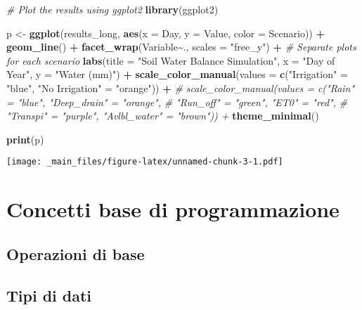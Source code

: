 \documentclass[
]{book}
\newenvironment{Shaded}{\begin{snugshade}}{\end{snugshade}}
\newcommand{\AttributeTok}[1]{\textcolor[rgb]{0.13,0.29,0.53}{#1}}
\newcommand{\CommentTok}[1]{\textcolor[rgb]{0.56,0.35,0.01}{\textit{#1}}}
\newcommand{\FunctionTok}[1]{\textcolor[rgb]{0.13,0.29,0.53}{\textbf{#1}}}
\newcommand{\NormalTok}[1]{#1}
\newcommand{\OtherTok}[1]{\textcolor[rgb]{0.56,0.35,0.01}{#1}}
\newcommand{\SpecialCharTok}[1]{\textcolor[rgb]{0.81,0.36,0.00}{\textbf{#1}}}
\newcommand{\StringTok}[1]{\textcolor[rgb]{0.31,0.60,0.02}{#1}}
\theoremstyle{definition}
\theoremstyle{definition}
\theoremstyle{definition}
\theoremstyle{definition}
\theoremstyle{remark}
\begin{document}
\begin{Shaded}
\begin{Highlighting}[]
\CommentTok{\# Plot the results using ggplot2}
\FunctionTok{library}\NormalTok{(ggplot2)}

\NormalTok{p }\OtherTok{\textless{}{-}} \FunctionTok{ggplot}\NormalTok{(results\_long, }\FunctionTok{aes}\NormalTok{(}\AttributeTok{x =}\NormalTok{ Day, }\AttributeTok{y =}\NormalTok{ Value, }\AttributeTok{color =}\NormalTok{ Scenario)) }\SpecialCharTok{+}
  \FunctionTok{geom\_line}\NormalTok{() }\SpecialCharTok{+}
  \FunctionTok{facet\_wrap}\NormalTok{(Variable}\SpecialCharTok{\textasciitilde{}}\NormalTok{., }\AttributeTok{scales =} \StringTok{"free\_y"}\NormalTok{) }\SpecialCharTok{+}  \CommentTok{\# Separate plots for each scenario}
  \FunctionTok{labs}\NormalTok{(}\AttributeTok{title =} \StringTok{"Soil Water Balance Simulation"}\NormalTok{, }\AttributeTok{x =} \StringTok{"Day of Year"}\NormalTok{, }\AttributeTok{y =} \StringTok{"Water (mm)"}\NormalTok{) }\SpecialCharTok{+}
  \FunctionTok{scale\_color\_manual}\NormalTok{(}\AttributeTok{values =} \FunctionTok{c}\NormalTok{(}\StringTok{"Irrigation"} \OtherTok{=} \StringTok{"blue"}\NormalTok{, }\StringTok{"No Irrigation"} \OtherTok{=} \StringTok{"orange"}\NormalTok{)) }\SpecialCharTok{+}
  \CommentTok{\# scale\_color\_manual(values = c("Rain" = "blue", "Deep\_drain" = "orange", }
    \CommentTok{\#                            "Run\_off" = "green", "ET0" = "red", }
    \CommentTok{\#                           "Transpi" = "purple", "Avlbl\_water" = "brown")) +}
  \FunctionTok{theme\_minimal}\NormalTok{()}

\FunctionTok{print}\NormalTok{(p)}
\end{Highlighting}
\end{Shaded}

\texttt{[image: \_main\_files/figure-latex/unnamed-chunk-3-1.pdf]}

\hypertarget{concetti-base-di-programmazione}{%
\chapter{Concetti base di programmazione}\label{concetti-base-di-programmazione}}

\hypertarget{operazioni-di-base}{%
\section{Operazioni di base}\label{operazioni-di-base}}

\hypertarget{tipi-di-dati}{%
\section{Tipi di dati}\label{tipi-di-dati}}
\end{document}
